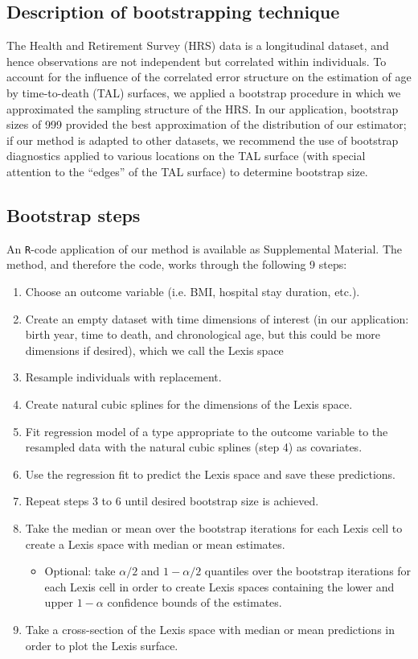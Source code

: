 \documentclass[11pt,oneside,a4paper]{article} %
\begin{document}
\begin{appendices}
\section{Description of bootstrapping technique}
The Health and Retirement Survey (HRS) data is a longitudinal dataset, and hence
observations are not independent but correlated within individuals. To account
for the influence of the correlated error structure on the estimation of age
by time-to-death (TAL) surfaces, we applied a bootstrap
\citep{efron1994introduction} procedure in which we approximated the sampling structure of the HRS. In our
application, bootstrap sizes of 999 provided the best approximation of the distribution of our estimator; if our method is adapted to other datasets, we recommend the use of bootstrap diagnostics applied to various locations on the TAL surface (with special attention to the ``edges'' of the TAL surface) to determine bootstrap size.

\subsection{Bootstrap steps}
An \texttt{R}-code application of our method is available as Supplemental Material. The method, and therefore the code, works through the following 9 steps:
\begin{enumerate}
\item{Choose an outcome variable (i.e. BMI, hospital stay duration, etc.).}
\item{Create an empty dataset with time dimensions of interest (in our application: birth year, time to death, and chronological age, but this could be more dimensions if desired), which we call the Lexis space}
\item{Resample individuals with replacement.}
\item{Create natural cubic splines for the dimensions of the Lexis space.}
\item{Fit regression model of a type appropriate to the outcome variable to the resampled data with the natural cubic splines (step 4) as covariates.}
\item{Use the regression fit to predict the Lexis space and save these predictions.}
\item{Repeat steps 3 to 6 until desired bootstrap size is achieved.}
\item{Take the median or mean over the bootstrap iterations for each Lexis cell to create a Lexis space with median or mean estimates.\begin{itemize}\item{Optional: take $\alpha/2$ and  $1-\alpha/2$ quantiles over the bootstrap iterations for each Lexis cell in order to create Lexis spaces containing the lower and upper $1-\alpha$ confidence bounds of the estimates.}\end{itemize}}
\item{Take a cross-section of the Lexis space with median or mean predictions in order to plot the Lexis surface.}
\end{enumerate}


\end{appendices}
\end{document}
